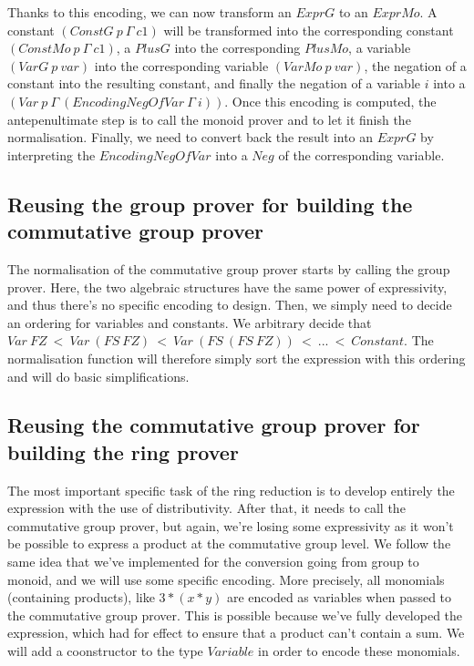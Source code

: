 Thanks to this encoding, we can now transform an $ExprG$ to an $ExprMo$. A constant $(ConstG\ p\ \Gamma\ c1)$ will be transformed into the corresponding constant $(ConstMo\ p\ \Gamma\ c1)$, a $PlusG$ into the corresponding $PlusMo$, a variable $(VarG\ p\ var)$ into the corresponding variable $(VarMo\ p\ var)$, the negation of a constant into the resulting constant, and finally the negation of a variable $i$ into a $(Var\ p\ \Gamma\ (EncodingNegOfVar\ \Gamma\ i))$.
Once this encoding is computed, the antepenultimate step is to call the monoid prover and to let it finish the normalisation. Finally, we need to convert back the result into an $ExprG$ by interpreting the $EncodingNegOfVar$ into a $Neg$ of the corresponding variable.


\subsection {Reusing the group prover for building the commutative group prover}

The normalisation of the commutative group prover starts by calling the group prover. Here, the two algebraic structures have the same power of expressivity, and thus there's no specific encoding to design. Then, we simply need to decide an ordering for variables and constants. We arbitrary decide that $Var\ FZ\ <\ Var\ (FS\ FZ)\ <\ Var\ (FS\ (FS\ FZ))\ <\ ...\ <\ Constant$. The normalisation function will therefore simply sort the expression with this ordering and will do basic simplifications.



\subsection {Reusing the commutative group prover for building the ring prover}

The most important specific task of the ring reduction is to develop entirely the expression with the use of distributivity. After that, it needs to call the commutative group prover, but again, we're losing some expressivity as it won't be possible to express a product at the commutative group level. We follow the same idea that we've implemented for the conversion going from group to monoid, and we will use some specific encoding. More precisely, all monomials (containing products), like $3*(x*y)$ are encoded as variables when passed to the commutative group prover. This is possible because we've fully developed the expression, which had for effect to ensure that a product can't contain a sum.
We will add a coonstructor to the type $Variable$ in order to encode these monomials.



